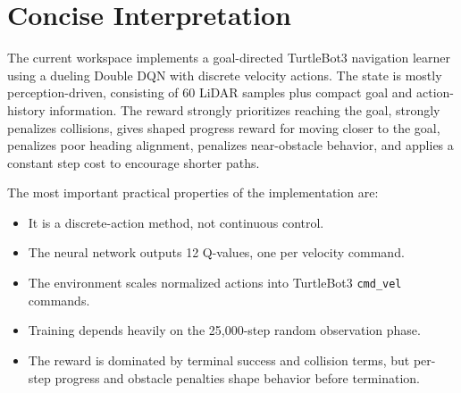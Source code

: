 \documentclass[11pt,a4paper]{article}
\begin{document}
\section{Concise Interpretation}

The current workspace implements a goal-directed TurtleBot3 navigation learner using a dueling Double DQN with discrete velocity actions. The state is mostly perception-driven, consisting of 60 LiDAR samples plus compact goal and action-history information. The reward strongly prioritizes reaching the goal, strongly penalizes collisions, gives shaped progress reward for moving closer to the goal, penalizes poor heading alignment, penalizes near-obstacle behavior, and applies a constant step cost to encourage shorter paths.

The most important practical properties of the implementation are:
\begin{itemize}[noitemsep]
    \item It is a discrete-action method, not continuous control.
    \item The neural network outputs 12 Q-values, one per velocity command.
    \item The environment scales normalized actions into TurtleBot3 \texttt{cmd\_vel} commands.
    \item Training depends heavily on the 25,000-step random observation phase.
    \item The reward is dominated by terminal success and collision terms, but per-step progress and obstacle penalties shape behavior before termination.
\end{itemize}
\end{document}
